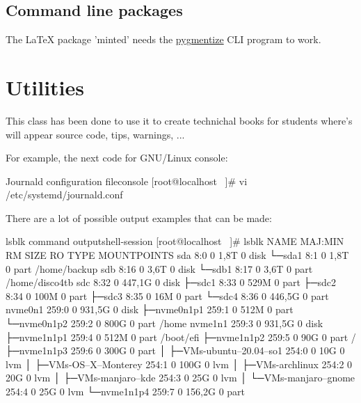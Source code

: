 \documentclass{yukibook}
\begin{document}
\section{Command line packages}
The \LaTeX{} package 'minted' needs the \href{https://pygments.org/}{pygmentize} CLI program to work.


\chapter{Utilities}
This class has been done to use it to create technichal books for students where's will appear source code, tips, warnings, ... 

For example, the next code for GNU/Linux console:

\begin{mycode}{Journald configuration file}{console}{}
[root@localhost ~]# vi /etc/systemd/journald.conf
\end{mycode}

There are a lot of possible output examples that can be made:

\begin{mycode}{lsblk command output}{shell-session}{}
[root@localhost ~]# lsblk
NAME                       MAJ:MIN RM   SIZE RO TYPE MOUNTPOINTS
sda                          8:0    0   1,8T  0 disk 
└─sda1                       8:1    0   1,8T  0 part /home/backup
sdb                          8:16   0   3,6T  0 disk 
└─sdb1                       8:17   0   3,6T  0 part /home/disco4tb
sdc                          8:32   0 447,1G  0 disk 
├─sdc1                       8:33   0   529M  0 part 
├─sdc2                       8:34   0   100M  0 part 
├─sdc3                       8:35   0    16M  0 part 
└─sdc4                       8:36   0 446,5G  0 part 
nvme0n1                    259:0    0 931,5G  0 disk 
├─nvme0n1p1                259:1    0   512M  0 part 
└─nvme0n1p2                259:2    0   800G  0 part /home
nvme1n1                    259:3    0 931,5G  0 disk 
├─nvme1n1p1                259:4    0   512M  0 part /boot/efi
├─nvme1n1p2                259:5    0    90G  0 part /
├─nvme1n1p3                259:6    0   300G  0 part 
│ ├─VMs-ubuntu--20.04--so1 254:0    0    10G  0 lvm  
│ ├─VMs-OS--X--Monterey    254:1    0   100G  0 lvm  
│ ├─VMs-archlinux          254:2    0    20G  0 lvm  
│ ├─VMs-manjaro--kde       254:3    0    25G  0 lvm  
│ └─VMs-manjaro--gnome     254:4    0    25G  0 lvm  
└─nvme1n1p4                259:7    0 156,2G  0 part
\end{mycode}
\end{document}
